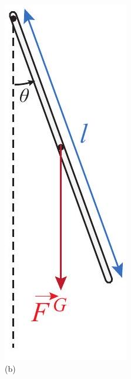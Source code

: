\documentclass[10pt]{article}
\begin{document}
\includegraphics[max width=\textwidth, center]{2024_09_14_9969b06773f10b6936e8g-283}\\
(b)
\end{document}

